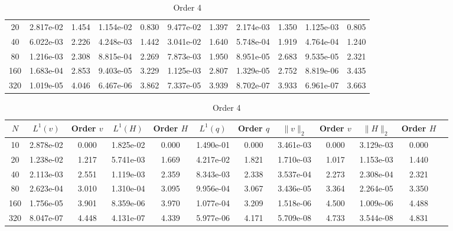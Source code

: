 \documentclass[english]{article}
\theoremstyle{thmstyleone}
\theoremstyle{thmstyletwo}
\theoremstyle{thmstylethree}
\begin{document}
\begin{table}[ht]
\begin{adjustbox}{width=1\textwidth}
\begin{subtable}{1.\linewidth}
\begin{tabular}{ccccccccccc}
				20 & 2.817e-02 & 1.454 & 1.154e-02 & 0.830 & 9.477e-02 & 1.397 & 2.174e-03 & 1.350 & 1.125e-03 & 0.805 \\
				40 & 6.022e-03 & 2.226 & 4.248e-03 & 1.442 & 3.041e-02 & 1.640 & 5.748e-04 & 1.919 & 4.764e-04 & 1.240 \\
				80 & 1.216e-03 & 2.308 & 8.815e-04 & 2.269 & 7.873e-03 & 1.950 & 8.951e-05 & 2.683 & 9.535e-05 & 2.321 \\
				160 & 1.683e-04 & 2.853 & 9.403e-05 & 3.229 & 1.125e-03 & 2.807 & 1.329e-05 & 2.752 & 8.819e-06 & 3.435 \\
				320 & 1.019e-05 & 4.046 & 6.467e-06 & 3.862 & 7.337e-05 & 3.939 & 8.702e-07 & 3.933 & 6.961e-07 & 3.663 \\
				\bottomrule
			\end{tabular}
		\end{subtable}
	\end{adjustbox}
	\begin{adjustbox}{width=1\textwidth}
	\small
		\begin{subtable}{1.\linewidth}
			\centering
			\caption{Order 4}
			\begin{tabular}{cccccccccccc}
				\toprule
				$N$ & $L^1(v)$ & Order $v$ & $L^1(H)$ & Order $H$ & $L^1(q)$ & Order $q$ & $\|v\|_2$ & Order $v$ & $\|H\|_2$ & Order $H$ \\
				\midrule
				10 & 2.878e-02 & 0.000 & 1.825e-02 & 0.000 & 1.490e-01 & 0.000 & 3.461e-03 & 0.000 & 3.129e-03 & 0.000 \\
				20 & 1.238e-02 & 1.217 & 5.741e-03 & 1.669 & 4.217e-02 & 1.821 & 1.710e-03 & 1.017 & 1.153e-03 & 1.440 \\
				40 & 2.113e-03 & 2.551 & 1.119e-03 & 2.359 & 8.343e-03 & 2.338 & 3.537e-04 & 2.273 & 2.308e-04 & 2.321 \\
				80 & 2.623e-04 & 3.010 & 1.310e-04 & 3.095 & 9.956e-04 & 3.067 & 3.436e-05 & 3.364 & 2.264e-05 & 3.350 \\
				160 & 1.756e-05 & 3.901 & 8.359e-06 & 3.970 & 1.077e-04 & 3.209 & 1.518e-06 & 4.500 & 1.009e-06 & 4.488 \\
				320 & 8.047e-07 & 4.448 & 4.131e-07 & 4.339 & 5.977e-06 & 4.171 & 5.709e-08 & 4.733 & 3.544e-08 & 4.831 \\
				\bottomrule
			\end{tabular}
		\end{subtable}
	\end{adjustbox}
	\begin{adjustbox}{width=1\textwidth}
	\small
		\begin{subtable}{1.\linewidth}

\end{subtable}
\end{adjustbox}
\end{table}
\end{document}
